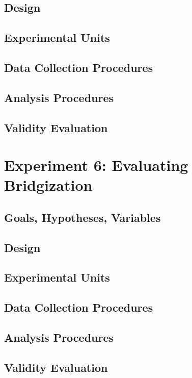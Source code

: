 \documentclass[10pt,nocc]{xrese_report}
\begin{document}
\subsection{Design}

\subsection{Experimental Units}

\subsection{Data Collection Procedures}

\subsection{Analysis Procedures}

\subsection{Validity Evaluation}

\section{Experiment 6: Evaluating Bridgization}

\subsection{Goals, Hypotheses, Variables}

\subsection{Design}

\subsection{Experimental Units}

\subsection{Data Collection Procedures}

\subsection{Analysis Procedures}

\subsection{Validity Evaluation}
\end{document}
